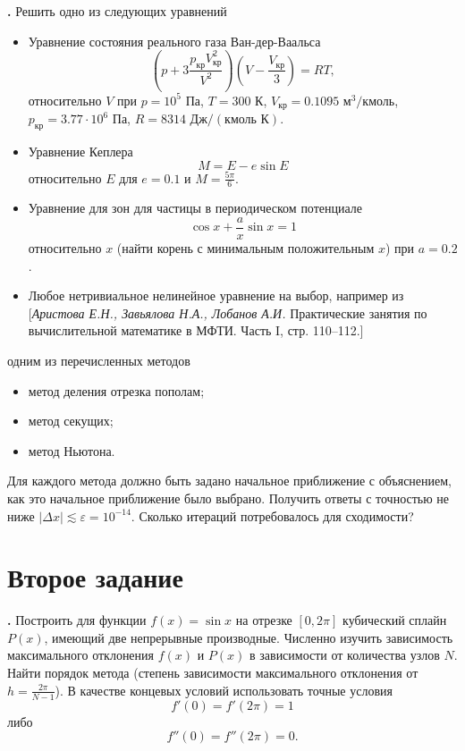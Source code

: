 \documentclass[12pt]{article}
\newcounter{task}
\newcommand{\problem}{\par\textbf{\stepcounter{task}\thetask. }}
\begin{document}
\problem Решить одно из следующих уравнений
\begin{itemize}
\item Уравнение состояния реального газа Ван-дер-Ваальса
\[
\left(p + 3\frac{p_\text{кр}V_\text{кр}^2}{V^2}\right) \left(V - \frac{V_\text{кр}}{3}\right) = RT,
\]
относительно $V$ при $p = 10^5 \text{ Па}$, $T = 300\text{ К}$, $V_\text{кр} =
0.1095 \text{ м}^3 / \text{кмоль}$,
$p_\text{кр} = 3.77\cdot 10^6 \text{ Па}$, $R = 8314 \text{ Дж} / (\text{кмоль
К})$.

\item Уравнение Кеплера
\[
M = E - e \sin E
\]
относительно $E$ для $e = 0.1$ и $M = \frac{5\pi}{6}$.

\item Уравнение для зон для частицы в периодическом потенциале
\[
\cos x + \frac{a}{x} \sin x = 1
\]
относительно $x$ (найти корень с минимальным положительным $x$) при $a = 0.2$.

\item Любое нетривиальное нелинейное уравнение на выбор, например из
[\textit{Аристова Е.Н., Завьялова Н.А., Лобанов А.И.} Практические занятия по
вычислительной математике в МФТИ. Часть I, стр. 110--112.]
\end{itemize}
одним из перечисленных методов
\begin{itemize}
\item метод деления отрезка пополам;
\item метод секущих;
\item метод Ньютона.
\end{itemize}

Для каждого метода должно быть задано начальное приближение с объяснением, как
это начальное приближение было выбрано. Получить ответы с точностью не ниже
$|\Delta x| \lesssim \varepsilon = 10^{-14}$. Сколько итераций потребовалось для
сходимости?

\section{Второе задание}

\problem Построить для функции $f(x) = \sin x$ на отрезке $[0, 2\pi]$ кубический
сплайн $P(x)$, имеющий две непрерывные производные. Численно изучить зависимость
максимального отклонения $f(x)$ и $P(x)$ в зависимости от количества узлов $N$.
Найти порядок метода (степень зависимости максимального отклонения от
$h = \frac{2\pi}{N - 1}$). В качестве концевых условий использовать точные
условия
\[
f'(0) = f'(2\pi) = 1
\]
либо
\[
f''(0) = f''(2\pi) = 0.
\]
\end{document}
